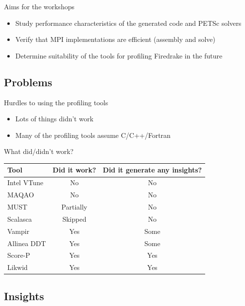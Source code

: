 \documentclass[pdf,aspectratio=169]{beamer}
\begin{document}
\begin{frame}{Aims for the workshops}

  \begin{itemize}
    \item Study performance characteristics of the generated code and PETSc solvers
    \item Verify that MPI implementations are efficient (assembly and solve)
    \item Determine suitability of the tools for profiling Firedrake in the future
  \end{itemize}

\end{frame}


\subsection{Problems}

\begin{frame}{Hurdles to using the profiling tools}
  \begin{itemize}
    \item Lots of things didn't work
    \item Many of the profiling tools assume C/C++/Fortran
  \end{itemize}
\end{frame}

\begin{frame}{What did/didn't work?}
  \centering
  \begin{tabular}{l|c|c}
    \textbf{Tool} & \textbf{Did it work?} & \textbf{Did it generate any insights?} \\
    \hline
    Intel VTune & No & No \\
    MAQAO & No & No \\
    MUST & Partially & No \\
    Scalasca & Skipped & No \\
    \hline
    Vampir & Yes & Some \\
    Allinea DDT & Yes & Some \\
    \hline
    Score-P & Yes & Yes \\
    Likwid & Yes & Yes
  \end{tabular}
\end{frame}


\subsection{Insights}
\end{document}

